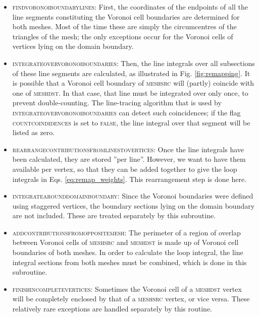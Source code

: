\documentclass{article}
\begin{document}
\begin{itemize}
\item \textsc{find\textunderscore voronoi\textunderscore boundary\textunderscore lines}: First, the coordinates of the endpoints of all the line segments constituting the Voronoi cell boundaries are determined for both meshes. Most of the time these are simply the circumcentres of the triangles of the mesh; the only exceptions occur for the Voronoi cells of vertices lying on the domain boundary.
\item \textsc{integrate\textunderscore over\textunderscore voronoi\textunderscore boundaries}: Then, the line integrals over all subsections of these line segments are calculated, as illustrated in Fig. \ref{fig:remapping}. It is possible that a Voronoi cell boundary of \textsc{mesh\textunderscore src} will (partly) coincide with one of \textsc{mesh\textunderscore dst}. In that case, that line must be integrated over only once, to prevent double-counting. The line-tracing algorithm that is used by \textsc{integrate\textunderscore over\textunderscore voronoi\textunderscore boundaries} can detect such coincidences; if the flag \textsc{countcoindidences} is set to \textsc{false}, the line integral over that segment will be listed as zero.
\item \textsc{rearrange\textunderscore contributions\textunderscore from\textunderscore lines\textunderscore to\textunderscore vertices}: Once the line integrals have been calculated, they are stored ''per line''. However, we want to have them available per vertex, so that they can be added together to give the loop integrals in Eqs. \eqref{eq:remap_weights}. This rearrangement step is done here.
\item \textsc{integrate\textunderscore around\textunderscore domain\textunderscore boundary}: Since the Voronoi boundaries were defined using staggered vertices, the boundary sections lying on the domain boundary are not included. These are treated separately by this subroutine.
\item \textsc{add\textunderscore contributions\textunderscore from\textunderscore opposite\textunderscore mesh}: The perimeter of a region of overlap between Voronoi cells of \textsc{mesh\textunderscore src} and \textsc{mesh\textunderscore dst} is made up of Voronoi cell boundaries of both meshes. In order to calculate the loop integral, the line integral sections from both meshes must be combined, which is done in this subroutine.
\item \textsc{finish\textunderscore incomplete\textunderscore vertices}: Sometimes the Voronoi cell of a \textsc{mesh\textunderscore dst} vertex will be completely enclosed by that of a \textsc{mesh\textunderscore src} vertex, or vice versa. These relatively rare exceptions are handled separately by this routine.

\end{itemize}
\end{document}
